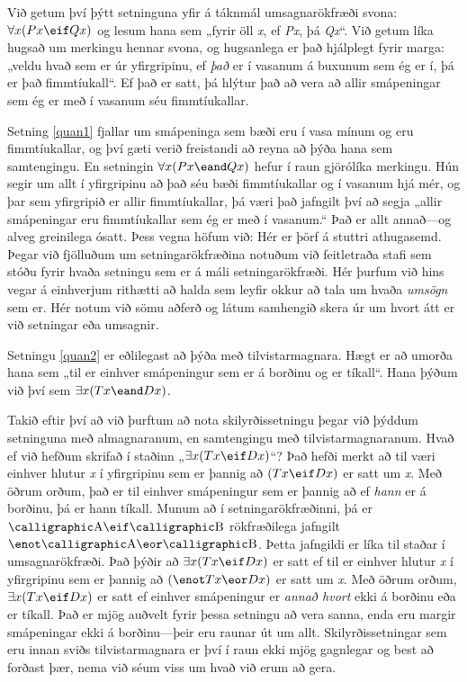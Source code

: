 Við getum því þýtt setninguna yfir á táknmál umsagnarökfræði svona: $\forall x(Px \eif Qx)$ og lesum hana sem „fyrir öll \emph{x}, ef \emph{Px}, þá \emph{Qx}“. Við getum líka hugsað um merkingu hennar svona, og hugsanlega er það hjálplegt fyrir marga: „veldu hvað sem er úr yfirgripinu, ef \emph{það} er í vasanum á buxunum sem ég er í, þá er það fimmtíukall“. Ef það er satt, þá hlýtur það að vera að allir smápeningar sem ég er með í vasanum séu fimmtíukallar.

Setning \ref{quan1} fjallar um smápeninga sem bæði eru í vasa mínum og eru fimmtíukallar, og því gæti verið freistandi að reyna að þýða hana sem samtengingu. En setningin $\forall x(Px \eand Qx)$ hefur í raun gjörólíka merkingu. Hún segir um allt í yfirgripinu að það séu bæði fimmtíukallar og í vasanum hjá mér, og þar sem yfirgripið er allir fimmtíukallar, þá væri það jafngilt því að segja „allir smápeningar eru fimmtíukallar sem ég er með í vasanum.“ Það er allt annað---og alveg greinilega ósatt. Þess vegna höfum við: 
Hér er þörf á stuttri athugasemd. Þegar við fjölluðum um setningarökfræðina notuðum við feitletraða stafi sem stóðu fyrir hvaða setningu sem er á máli setningarökfræði. Hér þurfum við hins vegar á einhverjum rithætti að halda sem leyfir okkur að tala um hvaða \emph{umsögn} sem er. Hér notum við sömu aðferð og látum samhengið skera úr um hvort átt er við setningar eða umsagnir.

Setningu \ref{quan2} er eðlilegast að þýða með tilvistarmagnara. Hægt er að umorða hana sem „til er einhver smápeningur sem er á borðinu og er tíkall“. Hana þýðum við því sem $\exists x(Tx \eand Dx)$.

Takið eftir því að við þurftum að nota skilyrðissetningu þegar við þýddum setninguna með almagnaranum, en samtengingu með tilvistarmagnaranum. Hvað ef við hefðum skrifað í staðinn „$\exists x(Tx \eif Dx)$“? Það hefði merkt að til væri einhver hlutur \emph{x} í yfirgripinu sem er þannig að $(Tx \eif Dx)$ er satt um \emph{x}. Með öðrum orðum, það er til einhver smápeningur sem er þannig að ef \emph{hann} er á borðinu, þá er hann tíkall. Munum að í setningarökfræðinni, þá er $\meta{A} \eif \meta{B}$ rökfræðilega jafngilt $\enot\meta{A} \eor \meta{B}$. Þetta jafngildi er líka til staðar í umsagnarökfræði. Það þýðir að $\exists x (Tx \eif Dx)$ er satt ef til er einhver hlutur \emph{x} í yfirgripinu sem er þannig að $(\enot Tx \eor Dx)$ er satt um \emph{x}. Með öðrum orðum, $\exists x (Tx \eif Dx)$ er satt ef einhver smápeningur er \emph{annað hvort} ekki á borðinu eða er tíkall. Það er mjög auðvelt fyrir þessa setningu að vera sanna, enda eru margir smápeningar ekki á borðinu---þeir eru raunar út um allt. Skilyrðissetningar sem eru innan sviðs tilvistarmagnara er því í raun ekki mjög gagnlegar og best að forðast þær, nema við séum viss um hvað við erum að gera.

